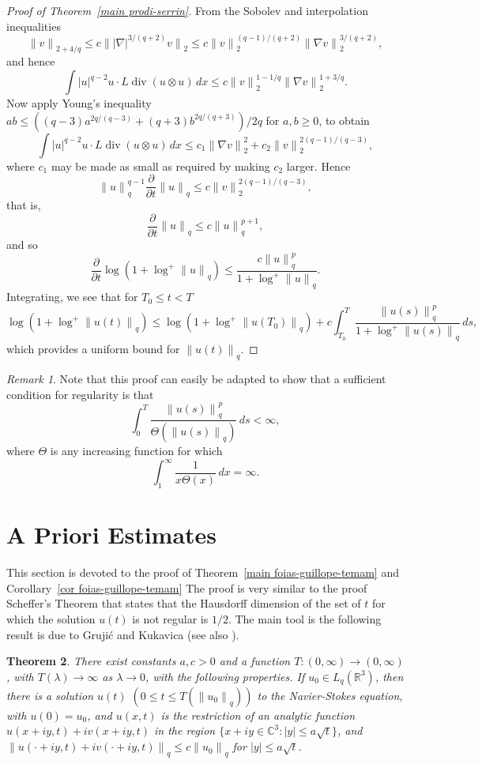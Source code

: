 \documentclass[12pt]{amsart}
\newtheorem{thm}{Theorem}[section]
\theoremstyle{remark}
\newtheorem{rem}[thm]{Remark}
\newcommand{\R}{{\mathbb R}}
\newcommand{\C}{{\mathbb C}}
\newcommand{\smodo}[1]{{\mathopen|#1\mathclose|}}
\newcommand{\snormo}[1]{{\mathopen\|#1\mathclose\|}}
\DeclareMathOperator{\divergence}{div}
\begin{document}
\begin{proof}[Proof of Theorem~\ref{main prodi-serrin}]
From the Sobolev and interpolation inequalities
$$ \snormo v_{2+4/q} \le c \snormo{ \smodo{\nabla}^{3/(q+2)} v}_2
   \le c \snormo v_2^{(q-1)/(q+2)} \snormo{\nabla v}_2^{3/(q+2)} ,$$
and hence
$$ \int \smodo u^{q-2} u \cdot L \divergence (u \otimes u) \, dx
   \le c
   \snormo v_2^{1-1/q} \snormo{\nabla v}_2^{1+3/q} .$$
Now apply Young's inequality $ab \le ((q-3)a^{2q/(q-3)} + (q+3)b^{2q/(q+3)})/2q$
for $a,b \ge 0$, to obtain
$$
   \int \smodo u^{q-2} u \cdot L \divergence (u \otimes u) \, dx
   \le 
   c_1 \snormo{\nabla v}_2^2 + c_2 \snormo v_2^{2(q-1)/(q-3)} ,
$$
where $c_1$ may be made as small as required by making $c_2$ larger.  
Hence
$$ \snormo u_q^{q-1} \frac\partial{\partial t}\snormo u_q
   \le c \snormo v_2^{2(q-1)/(q-3)},$$
that is,
$$ \frac\partial{\partial t}\snormo u_q
   \le c \snormo u_q^{p+1} ,$$
and so
$$ \frac\partial{\partial t}
   \log(1+\log^+\snormo u_q)
   \le 
   \frac{c \snormo u_q^p}{1+\log^+\snormo u_q} .$$
Integrating, we see that for $T_0 \le t < T$
$$ \log(1+\log^+\snormo{u(t)}_q) \le
   \log(1+\log^+\snormo{u(T_0)}_q) + 
   c \int_{T_0}^T \frac{\snormo{u(s)}_q^p}{1+\log^+\snormo{u(s)}_q} \, ds ,$$
which provides a uniform bound for $\snormo{u(t)}_q$.
\end{proof}

\begin{rem}
Note that this proof can easily be adapted to show that a sufficient condition
for regularity is that
$$
   \int_0^T \frac{\snormo{u(s)}_q^p}{\Theta(\snormo{u(s)}_q)} 
   \, ds < \infty ,$$
where $\Theta$ is any increasing function for which 
$$ \int_1^\infty \frac1{x\Theta(x)} \, dx = \infty .$$
\end{rem}

\section{A Priori Estimates}

This section is devoted to the proof of Theorem~\ref{main foias-guillope-temam}
and Corollary~\ref{cor foias-guillope-temam}
The proof is very similar to the proof Scheffer's Theorem \cite{scheffer} 
that states that the Hausdorff dimension
of the set of $t$ for which the solution $u(t)$ is not regular is
$1/2$.
The main tool is
the following result is due to 
Gruji\'c and Kukavica \cite{grujic-kukavica} (see also 
\cite{lemarie-rieusset 2}).

\begin{thm} \label{space analytic}
There exist constants $a,c>0$ and a function
$T:(0,\infty) \to (0,\infty)$, with $T(\lambda) \to \infty$ as $\lambda\to 0$,
with the following properties.  If $u_0 \in L_q(\R^3)$, then there is
a solution $u(t)$ $(0 \le t \le T(\snormo{u_0}_q))$
to the Navier-Stokes equation, with $u(0) = u_0$, and
$u(x,t)$ is the restriction of an analytic function 
$u(x+iy,t) + iv(x+iy,t)$ in the region
$\{x+iy \in \C^3 : \smodo y \le a \sqrt t\}$, and
$\snormo{u(\cdot+iy,t) + i v(\cdot+iy,t)}_q \le c \snormo{u_0}_q$ for
$\smodo y \le a \sqrt t$.
\end{thm}
\end{document}
